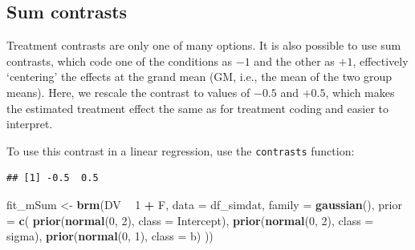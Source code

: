 \documentclass[12pt,]{krantz}
\newenvironment{Shaded}{\begin{snugshade}}{\end{snugshade}}
\newcommand{\DataTypeTok}[1]{\textcolor[rgb]{0.13,0.29,0.53}{#1}}
\newcommand{\DecValTok}[1]{\textcolor[rgb]{0.00,0.00,0.81}{#1}}
\newcommand{\FloatTok}[1]{\textcolor[rgb]{0.00,0.00,0.81}{#1}}
\newcommand{\KeywordTok}[1]{\textcolor[rgb]{0.13,0.29,0.53}{\textbf{#1}}}
\newcommand{\NormalTok}[1]{#1}
\newcommand{\OperatorTok}[1]{\textcolor[rgb]{0.81,0.36,0.00}{\textbf{#1}}}
\newcommand{\StringTok}[1]{\textcolor[rgb]{0.31,0.60,0.02}{#1}}
\theoremstyle{definition}
\theoremstyle{definition}
\theoremstyle{definition}
\theoremstyle{remark}
\begin{document}
\hypertarget{effectcoding}{%
\subsection{Sum contrasts}\label{effectcoding}}

Treatment contrasts are only one of many options. It is also possible to use sum contrasts, which code one of the conditions as \(-1\) and the other as \(+1\), effectively `centering' the effects at the grand mean (GM, i.e., the mean of the two group means). Here, we rescale the contrast to values of \(-0.5\) and \(+0.5\), which makes the estimated treatment effect the same as for treatment coding and easier to interpret.

To use this contrast in a linear regression, use the \texttt{contrasts} function:

\begin{Shaded}
\end{Shaded}

\begin{verbatim}
## [1] -0.5  0.5
\end{verbatim}

\begin{Shaded}
\begin{Highlighting}[]
\NormalTok{fit_mSum <-}\StringTok{ }\KeywordTok{brm}\NormalTok{(DV }\OperatorTok{~}\StringTok{ }\DecValTok{1} \OperatorTok{+}\StringTok{ }\NormalTok{F,}
                 \DataTypeTok{data =}\NormalTok{ df_simdat,}
                 \DataTypeTok{family =} \KeywordTok{gaussian}\NormalTok{(),}
                 \DataTypeTok{prior =} \KeywordTok{c}\NormalTok{(}
                     \KeywordTok{prior}\NormalTok{(}\KeywordTok{normal}\NormalTok{(}\DecValTok{0}\NormalTok{, }\DecValTok{2}\NormalTok{), }\DataTypeTok{class =}\NormalTok{ Intercept),}
                     \KeywordTok{prior}\NormalTok{(}\KeywordTok{normal}\NormalTok{(}\DecValTok{0}\NormalTok{, }\DecValTok{2}\NormalTok{), }\DataTypeTok{class =}\NormalTok{ sigma),}
                     \KeywordTok{prior}\NormalTok{(}\KeywordTok{normal}\NormalTok{(}\DecValTok{0}\NormalTok{, }\DecValTok{1}\NormalTok{), }\DataTypeTok{class =}\NormalTok{ b)}
\NormalTok{                 )) }
\end{Highlighting}
\end{Shaded}
\end{document}
